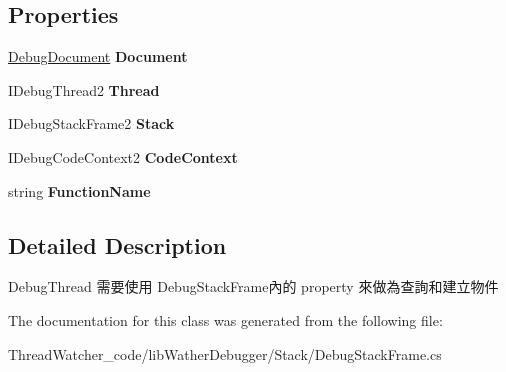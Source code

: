 \subsection*{Properties}
\begin{DoxyCompactItemize}
\item 
\hypertarget{classlib_wather_debugger_1_1_stack_1_1_debug_stack_frame_af62eff0cc1eb76fcceca8f1365e2298b}{\hyperlink{classlib_wather_debugger_1_1_document_context_1_1_debug_document}{Debug\+Document} {\bfseries Document}}\label{classlib_wather_debugger_1_1_stack_1_1_debug_stack_frame_af62eff0cc1eb76fcceca8f1365e2298b}

\item 
\hypertarget{classlib_wather_debugger_1_1_stack_1_1_debug_stack_frame_a1d15bf0a735655fa91f4df52ea7fef83}{I\+Debug\+Thread2 {\bfseries Thread}}\label{classlib_wather_debugger_1_1_stack_1_1_debug_stack_frame_a1d15bf0a735655fa91f4df52ea7fef83}

\item 
\hypertarget{classlib_wather_debugger_1_1_stack_1_1_debug_stack_frame_ae798e5ccade5d1705cecee1628d77dfb}{I\+Debug\+Stack\+Frame2 {\bfseries Stack}}\label{classlib_wather_debugger_1_1_stack_1_1_debug_stack_frame_ae798e5ccade5d1705cecee1628d77dfb}

\item 
\hypertarget{classlib_wather_debugger_1_1_stack_1_1_debug_stack_frame_ae17e16a48fccc48e1d898a4f54394712}{I\+Debug\+Code\+Context2 {\bfseries Code\+Context}}\label{classlib_wather_debugger_1_1_stack_1_1_debug_stack_frame_ae17e16a48fccc48e1d898a4f54394712}

\item 
\hypertarget{classlib_wather_debugger_1_1_stack_1_1_debug_stack_frame_a6ba3a61fbc6e57b2273265bc07957c28}{string {\bfseries Function\+Name}}\label{classlib_wather_debugger_1_1_stack_1_1_debug_stack_frame_a6ba3a61fbc6e57b2273265bc07957c28}

\end{DoxyCompactItemize}


\subsection{Detailed Description}
Debug\+Thread 需要使用 Debug\+Stack\+Frame內的 property 來做為查詢和建立物件 



The documentation for this class was generated from the following file\+:\begin{DoxyCompactItemize}
\item 
Thread\+Watcher\+\_\+code/lib\+Wather\+Debugger/\+Stack/Debug\+Stack\+Frame.\+cs\end{DoxyCompactItemize}

